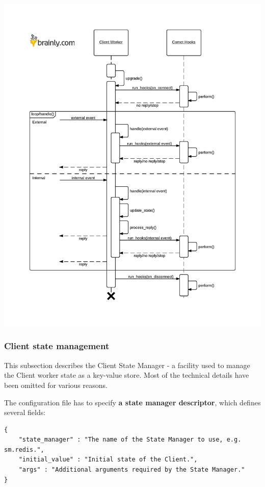 \documentclass[a4paper]{article}
\begin{document}
\begin{itemize}
\begin{center}
\includegraphics[scale=0.9]{./img/client_hooks.pdf}
\end{center}

\end{itemize} %
\subsubsection{Client state management}
\label{sec-7-1-5}
\label{ref-state_management}

This subsection describes the Client State Manager - a facility used to manage the Client worker state as a key-value store. Most of the technical details have been omitted for various reasons.

\noindent
The configuration file has to specify \textbf{a state manager descriptor}, which defines several fields:


\begin{verbatim}
{
    "state_manager" : "The name of the State Manager to use, e.g. sm.redis.",
    "initial_value" : "Initial state of the Client.",
    "args" : "Additional arguments required by the State Manager."
}
\end{verbatim}
\end{document}
